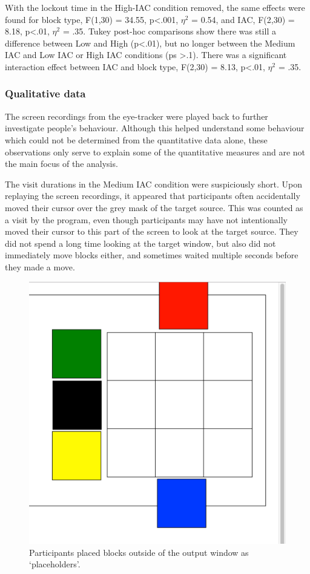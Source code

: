 With the lockout time in the High-IAC condition removed, the same effects were found for block type, F(1,30) = 34.55, p<.001, $\eta^2$ = 0.54, and IAC, F(2,30) = 8.18, p<.01, $\eta^2$ = .35. Tukey post-hoc comparisons show there was still a difference between Low and High (p<.01), but no longer between the Medium IAC and Low IAC or High IAC conditions (ps >.1). There was a significant interaction effect between IAC and block type, F(2,30) = 8.13, p<.01, $\eta^2$ = .35.

\subsubsection{Qualitative data}
The screen recordings from the eye-tracker were played back to further investigate people's behaviour. Although this helped understand some behaviour which could not be determined from the quantitative data alone, these observations only serve to explain some of the quantitative measures and are not the main focus of the analysis.

The visit durations in the Medium IAC condition were suspiciously short. Upon replaying the screen recordings, it appeared that participants often accidentally moved their cursor over the grey mask of the target source. This was counted as a visit by the program, even though participants may have not intentionally moved their cursor to this part of the screen to look at the target source. They did not spend a long time looking at the target window, but also did not immediately move blocks either, and sometimes waited multiple seconds before they made a move. 

\begin{figure}[!ht]
\centering
\includegraphics[scale=0.3]{images/ch34/ch4_placeholders.pdf}
\caption[Study 3 placeholders]{Participants placed blocks outside of the output window as `placeholders'.}
\vspace{-9pt}
\label{fig:ch4_placeholders}
\end{figure}

